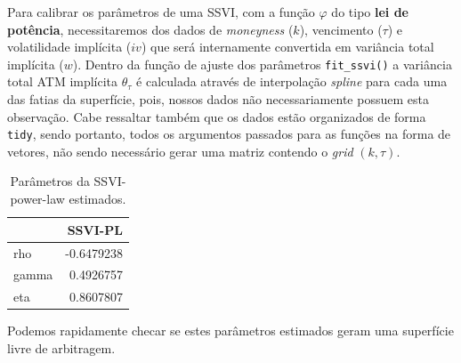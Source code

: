 \documentclass[]{book}
\newenvironment{Shaded}{\begin{snugshade}}{\end{snugshade}}
\newcommand{\KeywordTok}[1]{\textcolor[rgb]{0.13,0.29,0.53}{\textbf{#1}}}
\newcommand{\DataTypeTok}[1]{\textcolor[rgb]{0.13,0.29,0.53}{#1}}
\newcommand{\DecValTok}[1]{\textcolor[rgb]{0.00,0.00,0.81}{#1}}
\newcommand{\StringTok}[1]{\textcolor[rgb]{0.31,0.60,0.02}{#1}}
\newcommand{\OperatorTok}[1]{\textcolor[rgb]{0.81,0.36,0.00}{\textbf{#1}}}
\newcommand{\NormalTok}[1]{#1}
\theoremstyle{definition}
\theoremstyle{definition}
\theoremstyle{definition}
\theoremstyle{remark}
\begin{document}
Para calibrar os parâmetros de uma SSVI, com a função \(\varphi\) do
tipo \textbf{lei de potência}, necessitaremos dos dados de
\emph{moneyness} (\(k\)), vencimento (\(\tau\)) e volatilidade implícita
(\(iv\)) que será internamente convertida em variância total implícita
(\(w\)). Dentro da função de ajuste dos parâmetros \texttt{fit\_ssvi()}
a variância total ATM implícita \(\theta_\tau\) é calculada através de
interpolação \emph{spline} para cada uma das fatias da superfície, pois,
nossos dados não necessariamente possuem esta observação. Cabe ressaltar
também que os dados estão organizados de forma \texttt{tidy}, sendo
portanto, todos os argumentos passados para as funções na forma de
vetores, não sendo necessário gerar uma matriz contendo o \emph{grid}
\((k, \tau)\).

\begin{Shaded}
\end{Shaded}

\begin{table}[t]

\caption{\label{tab:ssvi-cal}Parâmetros da SSVI-power-law estimados.}
\centering
\begin{tabular}{l|r}
\hline
  & SSVI-PL\\
\hline
rho & -0.6479238\\
\hline
gamma & 0.4926757\\
\hline
eta & 0.8607807\\
\hline
\end{tabular}
\end{table}

Podemos rapidamente checar se estes parâmetros estimados geram uma
superfície livre de arbitragem.
\end{document}

